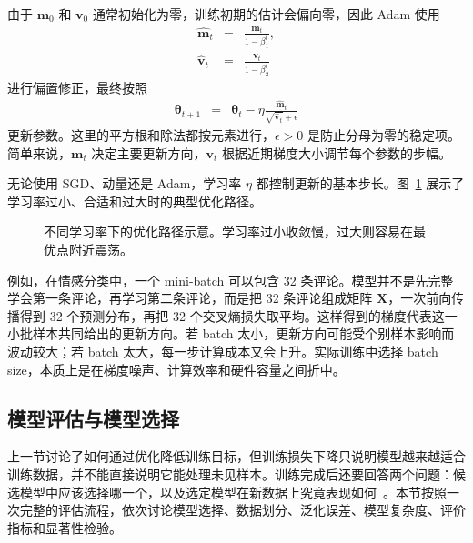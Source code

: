 由于 $\mathbf{m}_0$ 和 $\mathbf{v}_0$ 通常初始化为零，训练初期的估计会偏向零，因此 Adam 使用
\begin{eqnarray}
\widehat{\mathbf{m}}_t
& = &
\frac{\mathbf{m}_t}{1-\beta_1^t},\\
\widehat{\mathbf{v}}_t
& = &
\frac{\mathbf{v}_t}{1-\beta_2^t}
\end{eqnarray}
进行偏置修正，最终按照
\begin{eqnarray}
\boldsymbol{\theta}_{t+1}
& = &
\boldsymbol{\theta}_t
-
\eta
\frac{\widehat{\mathbf{m}}_t}
{\sqrt{\widehat{\mathbf{v}}_t}+\epsilon}
\end{eqnarray}
更新参数。这里的平方根和除法都按元素进行，$\epsilon>0$ 是防止分母为零的稳定项。简单来说，$\mathbf{m}_t$ 决定主要更新方向，$\mathbf{v}_t$ 根据近期梯度大小调节每个参数的步幅。

无论使用 SGD、动量还是 Adam，学习率 $\eta$ 都控制更新的基本步长。图~\ref{fig:nlpbook-learning-rate-comparison} 展示了学习率过小、合适和过大时的典型优化路径。


\begin{figure}[htbp]
  \centering
  
  \caption{不同学习率下的优化路径示意。学习率过小收敛慢，过大则容易在最优点附近震荡。}
  \label{fig:nlpbook-learning-rate-comparison}
\end{figure}

例如，在情感分类中，一个 mini-batch 可以包含 32 条评论。模型并不是先完整学会第一条评论，再学习第二条评论，而是把 32 条评论组成矩阵 $\mathbf{X}$，一次前向传播得到 32 个预测分布，再把 32 个交叉熵损失取平均。这样得到的梯度代表这一小批样本共同给出的更新方向。若 batch 太小，更新方向可能受个别样本影响而波动较大；若 batch 太大，每一步计算成本又会上升。实际训练中选择 batch size，本质上是在梯度噪声、计算效率和硬件容量之间折中。

\subsection{模型评估与模型选择}

上一节讨论了如何通过优化降低训练目标，但训练损失下降只说明模型越来越适合训练数据，并不能直接说明它能处理未见样本。训练完成后还要回答两个问题：候选模型中应该选择哪一个，以及选定模型在新数据上究竟表现如何~\cite{Hastie-etal:2009}。本节按照一次完整的评估流程，依次讨论模型选择、数据划分、泛化误差、模型复杂度、评价指标和显著性检验。

